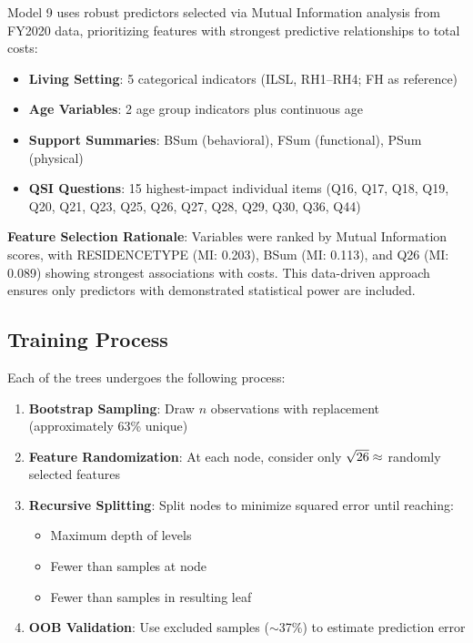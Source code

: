 Model 9 uses \ModelNineNumFeatures{} robust predictors selected via Mutual Information analysis from FY2020 data, prioritizing features with strongest predictive relationships to total costs:

\begin{itemize}
    \item \textbf{Living Setting}: 5 categorical indicators (ILSL, RH1--RH4; FH as reference)
    \item \textbf{Age Variables}: 2 age group indicators plus continuous age
    \item \textbf{Support Summaries}: BSum (behavioral), FSum (functional), PSum (physical)
    \item \textbf{QSI Questions}: 15 highest-impact individual items (Q16, Q17, Q18, Q19, Q20, Q21, Q23, Q25, Q26, Q27, Q28, Q29, Q30, Q36, Q44)
\end{itemize}

\textbf{Feature Selection Rationale}: Variables were ranked by Mutual Information scores, with RESIDENCETYPE (MI: 0.203), BSum (MI: 0.113), and Q26 (MI: 0.089) showing strongest associations with costs. This data-driven approach ensures only predictors with demonstrated statistical power are included.

\subsection{Training Process}

Each of the \ModelNineNTrees{} trees undergoes the following process:

\begin{enumerate}
    \item \textbf{Bootstrap Sampling}: Draw $n$ observations with replacement (approximately 63\% unique)
    \item \textbf{Feature Randomization}: At each node, consider only $\sqrt{26{}} \approx$ \ModelNineMaxFeatures{} randomly selected features
    \item \textbf{Recursive Splitting}: Split nodes to minimize squared error until reaching:
    \begin{itemize}
        \item Maximum depth of \ModelNineMaxDepth{} levels
        \item Fewer than \ModelNineMinSamplesSplit{} samples at node
        \item Fewer than \ModelNineMinSamplesLeaf{} samples in resulting leaf
    \end{itemize}
    \item \textbf{OOB Validation}: Use excluded samples ($\sim$37\%) to estimate prediction error
\end{enumerate}


